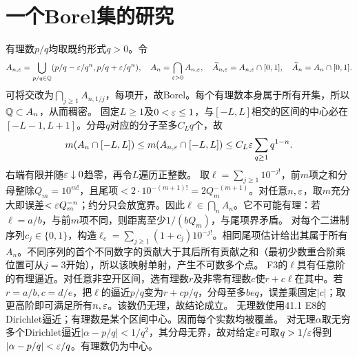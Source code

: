\documentclass[UTF8,fontset=fandol,11pt]{ctexart}
\begin{document}
\section{一个Borel集的研究}
有理数$p/q$均取既约形式$q>0$。令
\[A_{n,\varepsilon}=\bigcup_{p/q\in\mathbb Q}(p/q-\varepsilon/q^n,p/q+\varepsilon/q^n),\quad A_n=\bigcap_{\varepsilon>0}A_{n,\varepsilon},\quad\widetilde A_{n,\varepsilon}=A_{n,\varepsilon}\cap[0,1],\quad\widetilde A_n=A_n\cap[0,1].\]
可将交改为$\bigcap_{j\ge1}A_{n,1/j}$，每项开，故Borel。每个有理数本身属于所有开集，所以$\mathbb Q\subset A_n$，从而稠密。
固定$L\ge1$及$0<\varepsilon\le1$，与$[-L,L]$相交的区间的中心必在$[-L-1,L+1]$。分母$q$对应的分子至多$C_Lq$个，故
\[m(A_n\cap[-L,L])\le m(A_{n,\varepsilon}\cap[-L,L])\le C_L\varepsilon\sum_{q\ge1}q^{1-n}.\]
右端有限并随$\varepsilon\downarrow0$趋零，再令$L$遍历正整数。
取$\ell=\sum_{j\ge1}10^{-j!}$，前$m$项之和分母整除$Q_m=10^{m!}$，且尾项$<2\cdot10^{-(m+1)!}=2Q_m^{-(m+1)}$。对任意$n,\varepsilon$，取$m$充分大即误差$<\varepsilon Q_m^{-n}$；约分只会放宽界。因此$\ell\in\bigcap_nA_n$。它不可能有理：若$\ell=a/b$，与前$m$项不同，则距离至少$1/(bQ_m)$，与尾项界矛盾。
对每个二进制序列$c_j\in\{0,1\}$，构造$\ell_c=\sum_{j\ge1}(1+c_j)10^{-j!}$。相同尾项估计给出其属于所有$A_n$。不同序列的首个不同数字的贡献大于其后所有贡献之和（最初少数重合阶乘位置可从$j=3$开始），所以该映射单射，产生不可数多个点。
F3的$\ell$具有任意阶的有理逼近。对任意非空开区间，选有理数$r$及非零有理数$c$使$r+c\ell$在其中。若$r=a/b,c=d/e$，把$\ell$的逼近$p/q$变为$r+cp/q$，分母至多$beq$，误差乘固定$|c|$；取更高阶即可满足所有$n,\varepsilon$。该数仍无理，故结论成立。
无理数使用41.1 E8的Dirichlet逼近；有理数是某个区间中心。因而每个实数均被覆盖。
对无理$\alpha$取无穷多个Dirichlet逼近$|\alpha-p/q|<1/q^2$，其分母无界，故对给定$\varepsilon$可取$q>1/\varepsilon$得到$|\alpha-p/q|<\varepsilon/q$。有理数仍为中心。
\originalpages
\end{document}

